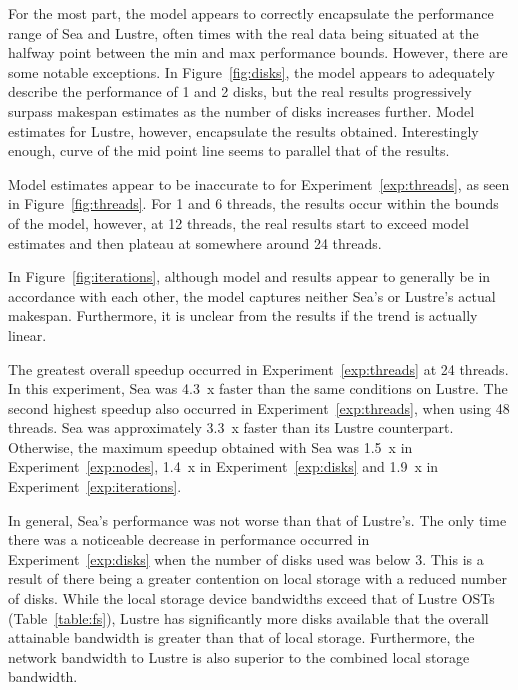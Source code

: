       For the most part, the model appears to correctly encapsulate the
      performance range of Sea and Lustre, often times with the real data being
      situated at the halfway point between the min and max performance bounds.
      However, there are some notable exceptions.
      In Figure~\ref{fig:disks}, the model appears to adequately describe the
      performance of 1 and 2 disks, but the real results progressively surpass
      makespan estimates as the number of disks increases further. Model estimates
      for Lustre, however, encapsulate the results obtained. Interestingly
      enough, curve of the mid point line seems to parallel that of the results.

      Model estimates appear to be inaccurate to for Experiment~\ref{exp:threads}, as seen in
      Figure~\ref{fig:threads}. For 1 and 6 threads, the results occur within
      the bounds of the model, however, at 12 threads, the real results start
      to exceed model estimates and then plateau at somewhere around 24 threads.

      In Figure~\ref{fig:iterations}, although model and results appear to
      generally be in accordance with each other, the model captures neither
      Sea's or Lustre's actual makespan. Furthermore, it is unclear from the
      results if the trend is actually linear.

      The greatest overall speedup occurred in Experiment~\ref{exp:threads} at 24 threads. In
      this experiment, Sea was 4.3~x faster than the same conditions on Lustre.
      The second highest speedup also occurred in Experiment~\ref{exp:threads}, when using 48
      threads. Sea was approximately 3.3~x faster than its Lustre counterpart.
      Otherwise, the maximum speedup obtained with Sea was 1.5~x in Experiment~\ref{exp:nodes},
      1.4~x in Experiment~\ref{exp:disks} and 1.9~x in Experiment~\ref{exp:iterations}.

      In general, Sea's performance was not worse than that of Lustre's. The only
      time there was a noticeable decrease in performance occurred in Experiment~\ref{exp:disks}
      when the number of disks used was below 3. This is a result of there being
      a greater contention on local storage with a reduced number of disks. While
      the local storage device bandwidths exceed that of Lustre OSTs (Table~\ref{table:fs}), Lustre has significantly more disks available that the overall
      attainable bandwidth is greater than that of local storage. Furthermore,
      the network bandwidth to Lustre is also superior to the combined local
      storage bandwidth.

